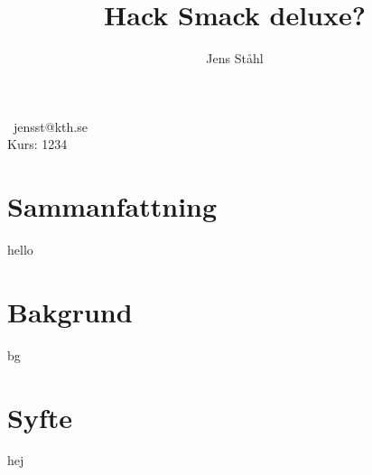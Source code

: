 \documentclass[a4paper]{article}
\author{Jens Ståhl}
\title{Hack Smack deluxe?}
\begin{document}
\maketitle
\ 
jensst@kth.se\\
Kurs: 1234\\

\section*{Sammanfattning}
hello
\newpage
\tableofcontents
\newpage
\section{Bakgrund}
bg
\section{Syfte}
hej
\end{document}
